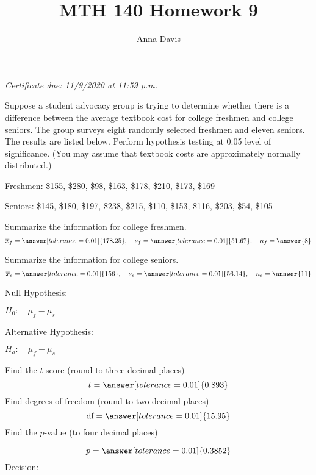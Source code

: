\documentclass{ximera}
\author{Anna Davis} \title{MTH 140 Homework 9}
\begin{document}
\begin{abstract}

\end{abstract}
\maketitle
 \textit{Certificate due: 11/9/2020 at 11:59 p.m.}
 \begin{problem}\label{prob:140hom9prob1}
Suppose a student advocacy group is trying to determine whether there is a difference between the average textbook cost for college freshmen and college seniors.  The group surveys eight randomly selected freshmen and eleven seniors.  The results are listed below.  Perform hypothesis testing at 0.05 level of significance. (You may assume that textbook costs are approximately normally distributed.)

Freshmen: \$155, \$280, \$98, \$163, \$178, \$210, \$173, \$169

Seniors: \$145, \$180, \$197, \$238, \$215, \$110, \$153, \$116, \$203, \$54, \$105  

Summarize the information for college freshmen.
$$\overline{x}_f=\answer[tolerance=0.01]{178.25},\quad s_f=\answer[tolerance=0.01]{51.67},\quad n_f=\answer{8}$$

Summarize the information for college seniors.
$$\overline{x}_s=\answer[tolerance=0.01]{156},\quad s_s=\answer[tolerance=0.01]{56.14},\quad n_s=\answer{11}$$

Null Hypothesis:

$H_0:\quad \mu_f-\mu_s$ 

Alternative Hypothesis:

$H_a:\quad \mu_f-\mu_s$ 

Find the $t$-score (round to three decimal places)
$$t=\answer[tolerance=0.01]{0.893}$$
Find degrees of freedom (round to two decimal places)
$$\mbox{df}=\answer[tolerance=0.01]{15.95}$$
Find the $p$-value (to four decimal places)
\begin{center}  
\end{center}
$$p=\answer[tolerance=0.01]{0.3852}$$
Decision:

\begin{multipleChoice} 
\end{multipleChoice}  


\end{problem}
\end{document}
